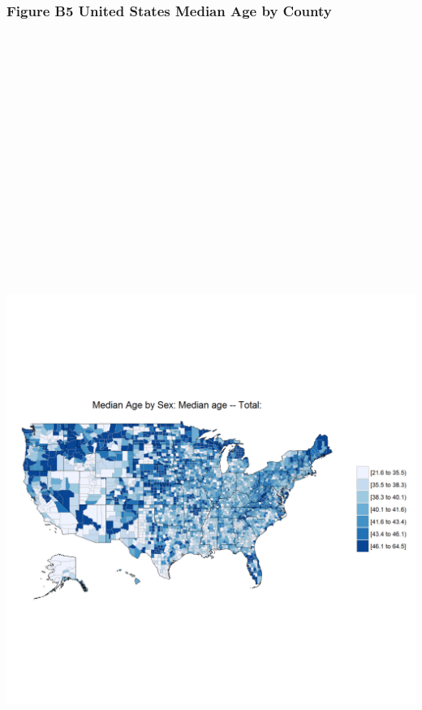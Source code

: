 \documentclass[]{article}
\begin{document}
\newpage

\subsubsection{Figure B5 United States Median Age by
County}\label{figure-b5-united-states-median-age-by-county}

\section{\texorpdfstring{\protect\includegraphics[height=12.50000in]{images/county_age.png}}{US Median Age by County}}\label{us-median-age-by-county}
\end{document}
